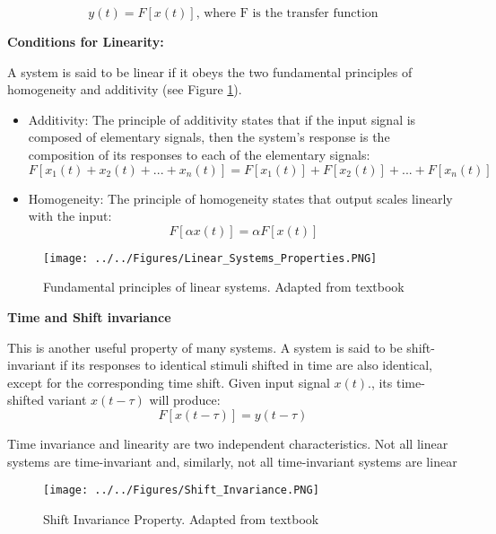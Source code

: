 \begin{equation}
    y(t) = F [x(t)] \textrm{, where F is the transfer function} 
\end{equation}

\textbf{Conditions for Linearity:}

A system is said to be linear if it obeys the two fundamental principles of homogeneity and additivity (see Figure \ref{fig:Linear_Systems_Properties}). 

\begin{itemize}
    \item Additivity: The principle of additivity states that if the input signal is composed
of elementary signals, then the system’s response is the composition of its
responses to each of the elementary signals:
    \begin{equation}
        F[x_1(t) + x_2(t) + ... + x_n(t)] = F[x_1(t)] + F[x_2(t)] + ... + F[x_n(t)]
    \end{equation}
    \item Homogeneity: The principle of homogeneity states that output scales linearly with the
input:
    \begin{equation}
        F[\alpha x(t)] = \alpha F[x(t)] 
    \end{equation}
\end{itemize}

\begin{figure}[H]
    \centering
    \texttt{[image: ../../Figures/Linear\_Systems\_Properties.PNG]}
    \caption{Fundamental principles of linear systems. Adapted from textbook}
    \label{fig:Linear_Systems_Properties}
\end{figure}

\textbf{Time and Shift invariance}


This is another useful property of many systems. A system is said to be shift-invariant if its responses to identical stimuli shifted in time are also identical, except for the corresponding
time shift. Given input signal $x(t)$., its time-shifted variant $x(t-\tau)$ will produce:
\begin{equation}
    F[x(t-\tau)] = y(t-\tau)
\end{equation}

Time invariance and linearity are two independent characteristics. Not all
linear systems are time-invariant and, similarly, not all time-invariant systems
are linear

\begin{figure}[H]
    \centering
    \texttt{[image: ../../Figures/Shift\_Invariance.PNG]}
    \caption{Shift Invariance Property. Adapted from textbook}
    \label{fig:Shift_Invariance}
\end{figure}

